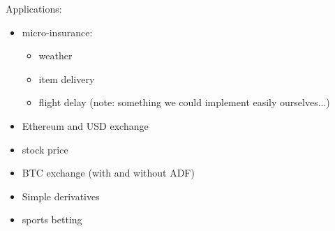 Applications:
\begin{itemize}
\item micro-insurance:
    \begin{itemize}
    \item weather
    \item item delivery
    \item flight delay (note: something we could implement easily ourselves...)
    \end{itemize}
\item Ethereum and USD exchange
\item stock price
\item BTC exchange (with and without ADF)
\item Simple derivatives
\item sports betting
\end{itemize}

